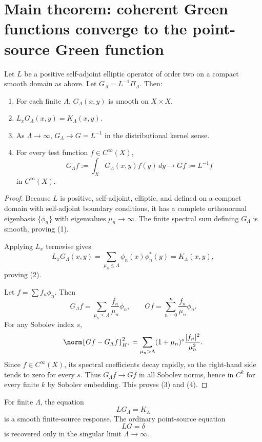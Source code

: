 \documentclass[11pt]{article}
\begin{document}
\section{Main theorem: coherent Green functions converge to the point-source Green function}

\begin{theorem}
Let \(L\) be a positive self-adjoint elliptic operator of order two on a compact smooth domain as above. Let \(G_\Lambda=L^{-1}\Pi_\Lambda\). Then:
\begin{enumerate}
\item For each finite \(\Lambda\), \(G_\Lambda(x,y)\) is smooth on \(X\times X\).
\item \(L_xG_\Lambda(x,y)=K_\Lambda(x,y)\).
\item As \(\Lambda\to\infty\), \(G_\Lambda\to G=L^{-1}\) in the distributional kernel sense.
\item For every test function \(f\in C^\infty(X)\),
\[
G_\Lambda f:=\int_XG_\Lambda(x,y)f(y)\,dy
\longrightarrow
Gf:=L^{-1}f
\]
in \(C^\infty(X)\).
\end{enumerate}
\end{theorem}

\begin{proof}
Because \(L\) is positive, self-adjoint, elliptic, and defined on a compact domain with self-adjoint boundary conditions, it has a complete orthonormal eigenbasis \(\{\phi_n\}\) with eigenvalues \(\mu_n\to\infty\). The finite spectral sum defining \(G_\Lambda\) is smooth, proving (1).

Applying \(L_x\) termwise gives
\[
L_xG_\Lambda(x,y)
=
\sum_{\mu_n\le\Lambda}\phi_n(x)\phi_n^*(y)
=
K_\Lambda(x,y),
\]
proving (2).

Let \(f=\sum f_n\phi_n\). Then
\[
G_\Lambda f=\sum_{\mu_n\le\Lambda}\frac{f_n}{\mu_n}\phi_n,
\qquad
Gf=\sum_{n=0}^\infty\frac{f_n}{\mu_n}\phi_n.
\]
For any Sobolev index \(s\),
\[
\norm{Gf-G_\Lambda f}_{H^s}^2
=
\sum_{\mu_n>\Lambda}(1+\mu_n)^s \frac{|f_n|^2}{\mu_n^2}.
\]
Since \(f\in C^\infty(X)\), its spectral coefficients decay rapidly, so the right-hand side tends to zero for every \(s\). Thus \(G_\Lambda f\to Gf\) in all Sobolev norms, hence in \(C^k\) for every finite \(k\) by Sobolev embedding. This proves (3) and (4). 
\end{proof}

\begin{corollary}
For finite \(\Lambda\), the equation
\[
LG_\Lambda=K_\Lambda
\]
is a smooth finite-source response. The ordinary point-source equation
\[
LG=\delta
\]
is recovered only in the singular limit \(\Lambda\to\infty\).
\end{corollary}
\end{document}
